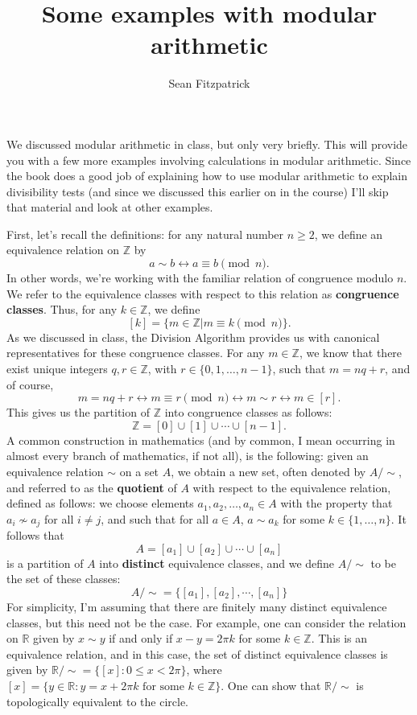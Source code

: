 \documentclass[letterpaper,12pt]{article}
\author{Sean Fitzpatrick}
\title{Some examples with modular arithmetic}
\newcommand{\Z}{\mathbb{Z}}
\newcommand{\R}{\mathbb{R}}
\newcommand{\modd}[3]{#1 \equiv #2 \pmod{#3}}
\begin{document}
\maketitle

 We discussed modular arithmetic in class, but only very briefly. This will provide you with a few more examples involving calculations in modular arithmetic. Since the book does a good job of explaining how to use modular arithmetic to explain divisibility tests (and since we discussed this earlier on in the course) I'll skip that material and look at other examples.

First, let's recall the definitions: for any natural number $n\geq 2$, we define an equivalence relation on $\Z$ by
\[
 a \sim b \leftrightarrow \modd{a}{b}{n}.
\]
In other words, we're working with the familiar relation of congruence modulo $n$. We refer to the equivalence classes with respect to this relation as {\bf congruence classes}. Thus, for any $k\in \Z$, we define
\[
 [k] = \{m\in \Z | \modd{m}{k}{n}\}.
\]
As we discussed in class, the Division Algorithm provides us with canonical representatives for these congruence classes. For any $m\in \Z$, we know that there exist unique integers $q,r\in \Z$, with $r\in \{0,1,\ldots, n-1\}$, such that $m=nq+r$, and of course,
\[
 m=nq+r \leftrightarrow \modd{m}{r}{n} \leftrightarrow m\sim r \leftrightarrow m\in [r].
\]
This gives us the partition of $\Z$ into congruence classes as follows:
\[
 \Z = [0]\cup [1]\cup \cdots \cup [n-1].
\]
A common construction in mathematics (and by common, I mean occurring in almost every branch of mathematics, if not all), is the following: given an equivalence relation $\sim$ on a set $A$, we obtain a new set, often denoted by $A/\!\!\sim$, and referred to as the {\bf quotient} of $A$ with respect to the equivalence relation, defined as follows: we choose elements $a_1, a_2,\ldots, a_n \in A$ with the property that $a_i\not\sim a_j$ for all $i\neq j$, and such that for all $a\in A$, $a\sim a_k$ for some $k\in \{1,\ldots, n\}$. It follows that 
\[
 A = [a_1]\cup [a_2]\cup \cdots \cup [a_n]
\]
 is a partition of $A$ into {\bf distinct} equivalence classes, and we define $A/\!\!\sim$ to be the set of these classes:
\[
 A/\!\!\sim = \{[a_1],[a_2],\cdots, [a_n]\}
\]
 For simplicity, I'm assuming that there are finitely many distinct equivalence classes, but this need not be the case. For example, one can consider the relation on $\mathbb{R}$ given by $x\sim y$ if and only if $x-y = 2\pi k$ for some $k\in\mathbb{Z}$. This is an equivalence relation, and in this case, the set of distinct equivalence classes is given by $\R/\!\!\sim = \{[x] : 0\leq x<2\pi\}$, where $[x] = \{y\in\mathbb{R} : y = x+2\pi k \text{ for some } k\in\Z\}$. One can show that $\R/\!\!\sim$ is topologically equivalent to the circle.
\end{document}
